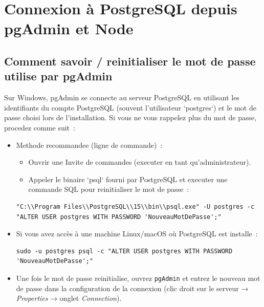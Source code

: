 \documentclass[a4paper,12pt]{book}
\begin{document}
\section{Connexion à PostgreSQL depuis pgAdmin et Node}

\subsection{Comment savoir / reinitialiser le mot de passe utilise par pgAdmin}

Sur Windows, pgAdmin se connecte au serveur PostgreSQL en utilisant les identifiants
du compte PostgreSQL (souvent l'utilisateur `postgres`) et le mot de passe choisi
lors de l'installation. Si vous ne vous rappelez plus du mot de passe, procedez
comme suit :

\begin{itemize}
    \item Methode recommandee (ligne de commande) :
    \begin{itemize}
        \item Ouvrir une Invite de commandes (executer en tant
        qu'administrateur).
        \item Appeler le binaire `psql` fourni par PostgreSQL et executer une
        commande SQL pour reinitialiser le mot de passe :
    \end{itemize}
    \begin{lstlisting}[style=bash]
"C:\\Program Files\\PostgreSQL\\15\\bin\\psql.exe" -U postgres -c "ALTER USER postgres WITH PASSWORD 'NouveauMotDePasse';"
    \end{lstlisting}
    \item Si vous avez accès à une machine Linux/macOS où PostgreSQL est installe :
    \begin{lstlisting}[style=bash]
sudo -u postgres psql -c "ALTER USER postgres WITH PASSWORD 'NouveauMotDePasse';"
    \end{lstlisting}
    \item Une fois le mot de passe reinitialise, ouvrez \texttt{pgAdmin} et entrez
    le nouveau mot de passe dans la configuration de la connexion (clic droit
    sur le serveur → \emph{Properties} → onglet \emph{Connection}).
\end{itemize}
\end{document}

